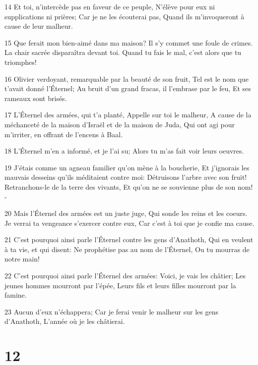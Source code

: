 \par 14 Et toi, n'intercède pas en faveur de ce peuple, N'élève pour eux ni supplications ni prières; Car je ne les écouterai pas, Quand ils m'invoqueront à cause de leur malheur.
\par 15 Que ferait mon bien-aimé dans ma maison? Il s'y commet une foule de crimes. La chair sacrée disparaîtra devant toi. Quand tu fais le mal, c'est alors que tu triomphes!
\par 16 Olivier verdoyant, remarquable par la beauté de son fruit, Tel est le nom que t'avait donné l'Éternel; Au bruit d'un grand fracas, il l'embrase par le feu, Et ses rameaux sont brisés.
\par 17 L'Éternel des armées, qui t'a planté, Appelle sur toi le malheur, A cause de la méchanceté de la maison d'Israël et de la maison de Juda, Qui ont agi pour m'irriter, en offrant de l'encens à Baal.
\par 18 L'Éternel m'en a informé, et je l'ai su; Alors tu m'as fait voir leurs oeuvres.
\par 19 J'étais comme un agneau familier qu'on mène à la boucherie, Et j'ignorais les mauvais desseins qu'ils méditaient contre moi: Détruisons l'arbre avec son fruit! Retranchons-le de la terre des vivants, Et qu'on ne se souvienne plus de son nom! -
\par 20 Mais l'Éternel des armées est un juste juge, Qui sonde les reins et les coeurs. Je verrai ta vengeance s'exercer contre eux, Car c'est à toi que je confie ma cause.
\par 21 C'est pourquoi ainsi parle l'Éternel contre les gens d'Anathoth, Qui en veulent à ta vie, et qui disent: Ne prophétise pas au nom de l'Éternel, Ou tu mourras de notre main!
\par 22 C'est pourquoi ainsi parle l'Éternel des armées: Voici, je vais les châtier; Les jeunes hommes mourront par l'épée, Leurs fils et leurs filles mourront par la famine.
\par 23 Aucun d'eux n'échappera; Car je ferai venir le malheur sur les gens d'Anathoth, L'année où je les châtierai.

\chapter{12}

